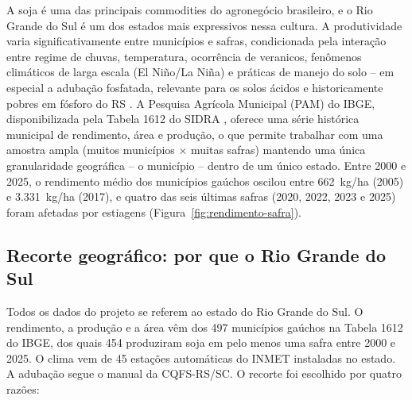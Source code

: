 \documentclass[12pt]{article}
\begin{document}
A soja é uma das principais commodities do agronegócio brasileiro, e o Rio
Grande do Sul é um dos estados mais expressivos nessa cultura. A
produtividade varia significativamente entre municípios e safras,
condicionada pela interação entre regime de chuvas, temperatura, ocorrência
de veranicos, fenômenos climáticos de larga escala (El Niño/La Niña) e
práticas de manejo do solo -- em especial a adubação fosfatada, relevante
para os solos ácidos e historicamente pobres em fósforo do RS
\cite{sbcs2016}. A Pesquisa Agrícola Municipal (PAM) do IBGE, disponibilizada
pela Tabela 1612 do SIDRA \cite{ibge}, oferece uma série histórica municipal
de rendimento, área e produção, o que permite trabalhar com uma amostra
ampla (muitos municípios $\times$ muitas safras) mantendo uma única
granularidade geográfica -- o município -- dentro de um único estado. Entre
2000 e 2025, o rendimento médio dos municípios gaúchos oscilou entre
662~kg/ha (2005) e 3.331~kg/ha (2017), e quatro das seis últimas safras
(2020, 2022, 2023 e 2025) foram afetadas por estiagens
(Figura~\ref{fig:rendimento-safra}).

\subsection{Recorte geográfico: por que o Rio Grande do Sul}
\label{sec:recorte-rs}

Todos os dados do projeto se referem ao estado do Rio Grande do Sul. O
rendimento, a produção e a área vêm dos 497 municípios gaúchos na Tabela
1612 do IBGE, dos quais 454 produziram soja em pelo menos uma safra entre
2000 e 2025. O clima vem de 45 estações automáticas do INMET instaladas no
estado. A adubação segue o manual da CQFS-RS/SC. O recorte foi escolhido
por quatro razões:
\end{document}

